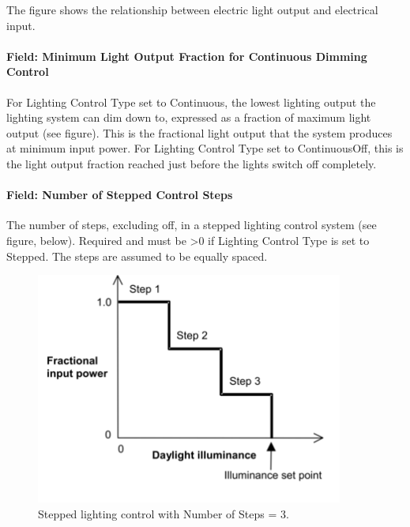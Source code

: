 The figure shows the relationship between electric light output and electrical input.

\paragraph{Field: Minimum Light Output Fraction for Continuous Dimming Control}\label{field-minimum-light-output-fraction-for-continuous-dimming-control}

For Lighting Control Type set to Continuous, the lowest lighting output the lighting system can dim down to, expressed as a fraction of maximum light output (see figure). This is the fractional light output that the system produces at minimum input power. For Lighting Control Type set to ContinuousOff, this is the light output fraction reached just before the lights switch off completely.

\paragraph{Field: Number of Stepped Control Steps}\label{field-number-of-stepped-control-steps}

The number of steps, excluding off, in a stepped lighting control system (see figure, below). Required and must be \textgreater{}0 if Lighting Control Type is set to Stepped. The steps are assumed to be equally spaced.

\begin{figure}[hbtp] %
\centering
\includegraphics[width=0.9\textwidth, height=0.9\textheight, keepaspectratio=true]{media/image097.png}
\caption{Stepped lighting control with Number of Steps = 3. \protect \label{fig:stepped-lighting-control-with-number-of-steps}}
\end{figure}

